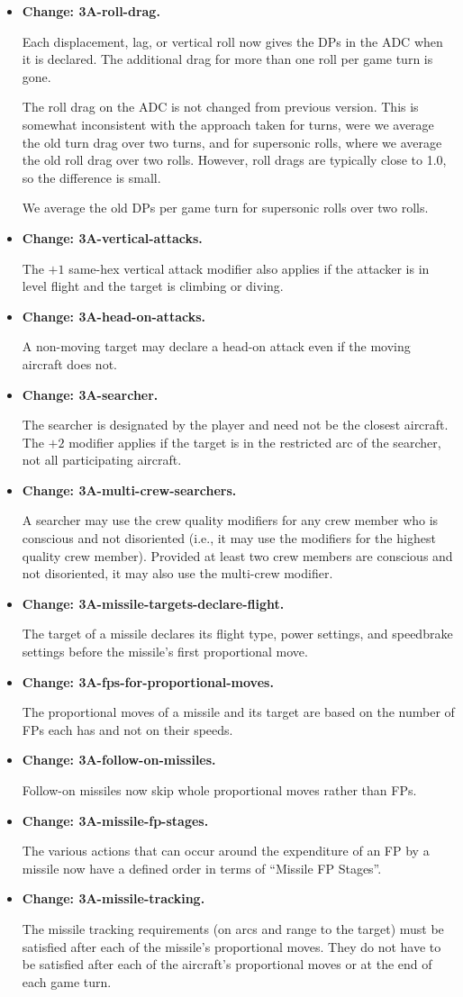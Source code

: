 \documentclass[10pt]{report}
\newcommand{\itemtag}[1]{\item \textbf{Change: #1.}\par}
\begin{document}
\begin{itemize}
    \itemtag{3A-roll-drag} Each displacement, lag, or vertical roll now gives the DPs in the ADC when it is declared. The additional drag for more than one roll per game turn is gone.
    
    The roll drag on the ADC is not changed from previous version. This is somewhat inconsistent with the approach taken for turns, were we average the old turn drag over two turns, and for supersonic rolls, where we average the old roll drag over two rolls. However, roll drags are typically close to 1.0, so the difference is small.
    
    We average the old DPs per game turn for supersonic rolls over two rolls.

    \itemtag{3A-vertical-attacks} The $+1$ same-hex vertical attack modifier also applies if the attacker is in level flight and the target is climbing or diving.

    \itemtag{3A-head-on-attacks} A non-moving target may declare a head-on attack even if the moving aircraft does not.
    
    \itemtag{3A-searcher} The searcher is designated by the player and need not be the closest aircraft. The $+2$ modifier applies if the target is in the restricted arc of the searcher, not all participating aircraft.
    
    \itemtag{3A-multi-crew-searchers} A searcher may use the crew quality modifiers for any crew member who is conscious and not disoriented (i.e., it may use the modifiers for the highest quality crew member). Provided at least two crew members are conscious and not disoriented, it may also use the multi-crew modifier.
    
    \itemtag{3A-missile-targets-declare-flight} The target of a missile declares its flight type, power settings, and speedbrake settings before the missile's first proportional move.
    
    \itemtag{3A-fps-for-proportional-moves} The proportional moves of a missile and its target are based on the number of FPs each has and not on their speeds.
    
    \itemtag{3A-follow-on-missiles} Follow-on missiles now skip whole proportional moves rather than FPs.
    
    \itemtag{3A-missile-fp-stages} The various actions that can occur around the expenditure of an FP by a missile now have a defined order in terms of “Missile FP Stages”.
    
    \itemtag{3A-missile-tracking} The missile tracking requirements (on arcs and range to the target) must be satisfied after each of the missile's proportional moves. They do not have to be satisfied after each of the aircraft's proportional moves or at the end of each game turn.
    

\end{itemize}
\end{document}
